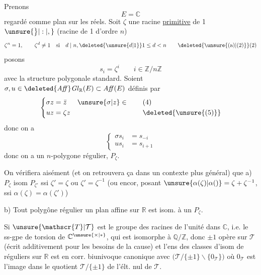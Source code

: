 Prenons
\[
E=\mathbb{C} \tag*{(1)}
\]
regardé comme plan sur les réels. Soit
 $\zeta$ une racine \uline{primitive}  de 1 $\unsure{\big\}|:|,}$
 (racine de 1 d'ordre $n$)
\[
\zeta^n=1,\qquad \zeta^d\ne 1\quad\text{si}\quad d\mid n,\deleted{\unsure{d|1}}1\leq d<n
\tag*{\deleted{\unsure{(a)|(2)}}(2)}
\]
posons
\[
s_i=\zeta^i\qquad i\in\mathbb{Z}/n\mathbb{Z}\tag*{(3)}
\]
avec la structure polygonale  standard.
Soient $\sigma,u\in\deleted{\mathit{Aff}}\mathit{Gl}_{\mathbb{R}}(E)\subset\mathit{Aff}(E)$ définis par
\[
\left\{\begin{aligned}
\sigma z&=\bar z &&\unsure{\sigma|z}\in\\
uz&=\zeta z
\end{aligned}\right.
\tag*{\(\begin{aligned}&\text{(4)}\\&\deleted{\unsure{(5)}}\end{aligned}\)}
\]
donc on a
\[
\left\{\begin{aligned}
\sigma s_i&=s_{-i}\\
us_i&=s_{i+1}
\end{aligned}\right.\tag*{(5)}
\]
donc on a un $n$-polygone régulier, $P_{\zeta}$.

On vérifiera  aisément (et on retrouvera
ça dans un contexte plus général)
que
a) $P_\zeta$ isom  $P_{\zeta'}$ ssi $\zeta'=\zeta$ ou $\zeta'=\zeta^{-1}$
(ou encor, posant $\unsure{\alpha(\zeta)|\alpha()}=\zeta+\zeta^{-1}$, ssi $\alpha(\zeta)=\alpha(\zeta')$)

b) Tout polygône régulier 
un plan affine sur $\mathbb R$ est isom. à un $P_\zeta$.

Si $\unsure{\mathscr{T}|\mathcal{T}}$ est le groupe des racines de l'unité dans $\mathbb{C}$,  i.e. le ss-gpe de
torsion de $\mathbb{C}^{\unsure{\times|*}}$, qui est isomorphe à
$\mathbb{Q}/\mathbb{Z}$, 
donc $\pm1$ opère sur
$\mathscr{T}$ (écrit additivement pour les besoins de la
cause) et  l'ens des classes
d'isom de  réguliers sur $\mathbb R$
est en corr. biunivoque canonique
avec $\bigl(\mathscr{T}/\{\pm1\}\mathbin{\backslash}\{0_{\mathscr{T}}\}\bigr)$ où $0_{\mathscr{T}}$ est l'image
dans le quotient $\mathscr{T}/\{\pm1\}$ de l'élt. nul de $\mathscr{T}$.

